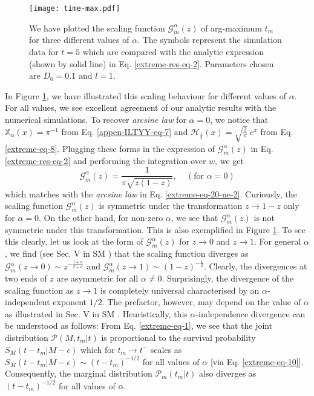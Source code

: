 \documentclass[showpacs,amsmath,amssymb,aps,pre,twocolumn,]{revtex4-1}
\begin{document}
\begin{figure}[t]
\texttt{[image: time-max.pdf]}
\centering
\caption{We have plotted the scaling function $\mathcal{G}_m^{\alpha}(z)$ of arg-maximum $t_m$ for three different values of $\alpha$. The symbols represent the simulation data for $t=5$ which are compared with the analytic expression (shown by solid line) in Eq. \eqref{extreme-res-eq-2}. Parameters chosen are $D_0 = 0.1$ and $l=1$.}
\label{timemax-fig}
\end{figure}

In Figure \ref{timemax-fig}, we have illustrated this scaling behaviour for different values of $\alpha$. For all values, we see excellent agreement of our analytic results with the numerical simulations. To recover \textit{arcsine law} for $\alpha =0$, we notice that $\mathbb{X}_{\alpha}(x) = \pi ^{-1}$ from Eq. \eqref{appen-ILTYY-eq-7} and $\mathcal{H}_{\frac{1}{2}}(x) = \sqrt{\frac{2}{\pi}} ~e^{x}$ from Eq. \eqref{extreme-eq-8}. Plugging these forms in the expression of $\mathcal{G}_m^{\alpha}(z)$ in Eq. \eqref{extreme-res-eq-2} and performing the integration over $w$, we get
$$\mathcal{G}_m^{\alpha}(z) = \frac{1}{\pi\sqrt{z(1-z)}},~~~~~(\text{for } \alpha =0)$$
which matches with the \textit{arcsine law} in Eq. \eqref{extreme-eq-20-ne-2}. Curiously, the scaling function $\mathcal{G}_m^{\alpha}(z)$ is symmetric under the transformation $z \to 1-z$ only for $\alpha =0$. On the other hand, for non-zero $\alpha$, we see that $\mathcal{G}_m^{\alpha}(z)$ is not symmetric under this transformation. This is also exemplified in Figure \ref{timemax-fig}. To see this clearly, let us look at the form of $\mathcal{G}_m^{\alpha}(z)$ for $z \to 0$ and $z \to 1$. For general $\alpha$, we find (see Sec. V in SM \cite{Supplementary}) that the scaling function diverges as $\mathcal{G} _{m}^{\alpha} \left( z \to 0 \right) \sim z^{-\frac{1+\alpha}{2+\alpha}}$ and $\mathcal{G} _{m}^{\alpha} \left( z \to 1 \right) \sim (1-z)^{-\frac{1}{2}}$. Clearly, the divergences at two ends of $z$ are asymmetric for all $\alpha \neq 0$. Surprisingly, the divergence of the scaling function as $z \to 1$ is completely universal characterised by an $\alpha$-independent exponent $1/2$. The prefactor, however, may depend on the value of $\alpha$ as illustrated in Sec. V in SM \cite{Supplementary}. Heuristically, this $\alpha$-independence divergence can be understood as follows: From Eq. \eqref{extreme-eq-1}, we see that the joint distribution $\mathcal{P}(M, t_m|t)$ is proportional to the survival probability $S_M(t-t_m|M-\epsilon)$ which for $t_m \to t^-$ scales as $S_M(t-t_m|M-\epsilon) \sim  (t-t_m)^{-1/2}$ for all values of $\alpha$ [via Eq. \eqref{extreme-eq-10}]. Consequently, the marginal distribution $\mathcal{P}_m(t_m|t)$ also diverges as $(t-t_m)^{-1/2}$ for all values of $\alpha$.
\end{document}
